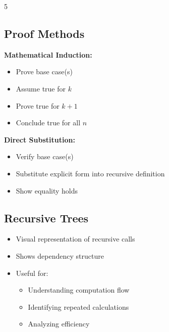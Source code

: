 \documentclass[a4paper,landscape]{article}
\begin{document}
\begin{multicols*}{5}
\subsection*{Proof Methods}
\textbf{Mathematical Induction:}
\begin{itemize}[leftmargin=*, itemsep=0pt]
    \item Prove base case(s)
    \item Assume true for $k$
    \item Prove true for $k+1$
    \item Conclude true for all $n$
\end{itemize}

\textbf{Direct Substitution:}
\begin{itemize}[leftmargin=*, itemsep=0pt]
    \item Verify base case(s)
    \item Substitute explicit form into recursive definition
    \item Show equality holds
\end{itemize}

\subsection*{Recursive Trees}
\begin{itemize}[leftmargin=*, itemsep=0pt]
    \item Visual representation of recursive calls
    \item Shows dependency structure
    \item Useful for:
    \begin{itemize}[leftmargin=*, itemsep=0pt]
        \item Understanding computation flow
        \item Identifying repeated calculations
        \item Analyzing efficiency
    \end{itemize}
\end{itemize}

\end{multicols*}
\end{document}
